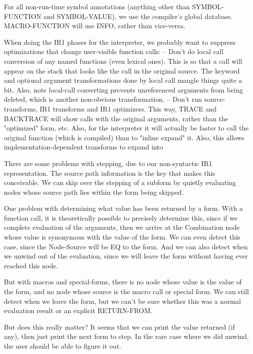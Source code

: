 For all non-run-time symbol annotations (anything other than SYMBOL-FUNCTION
and SYMBOL-VALUE), we use the compiler's global database.  MACRO-FUNCTION will
use INFO, rather than vice-versa.

When doing the IR1 phases for the interpreter, we probably want to suppress
optimizations that change user-visible function calls:
 -- Don't do local call conversion of any named functions (even lexical ones).
    This is so that a call will appear on the stack that looks like the call in
    the original source.  The keyword and optional argument transformations
    done by local call mangle things quite a bit.  Also, note local-call
    converting prevents unreferenced arguments from being deleted, which is
    another non-obvious transformation.
 -- Don't run source-transforms, IR1 transforms and IR1 optimizers.  This way,
    TRACE and BACKTRACE will show calls with the original arguments, rather
    than the "optimized" form, etc.  Also, for the interpreter it will
    actually be faster to call the original function (which is compiled) than
    to "inline expand" it.  Also, this allows implementation-dependent
    transforms to expand into %

There are some problems with stepping, due to our non-syntactic IR1
representation.  The source path information is the key that makes this
conceivable.  We can skip over the stepping of a subform by quietly evaluating
nodes whose source path lies within the form being skipped.

One problem with determining what value has been returned by a form.  With a
function call, it is theoretically possible to precisely determine this, since
if we complete evaluation of the arguments, then we arrive at the Combination
node whose value is synonymous with the value of the form.  We can even detect
this case, since the Node-Source will be EQ to the form.  And we can also
detect when we unwind out of the evaluation, since we will leave the form
without having ever reached this node.

But with macros and special-forms, there is no node whose value is the value of
the form, and no node whose source is the macro call or special form.  We can
still detect when we leave the form, but we can't be sure whether this was a
normal evaluation result or an explicit RETURN-FROM.  

But does this really matter?  It seems that we can print the value returned (if
any), then just print the next form to step.  In the rare case where we did
unwind, the user should be able to figure it out.  

